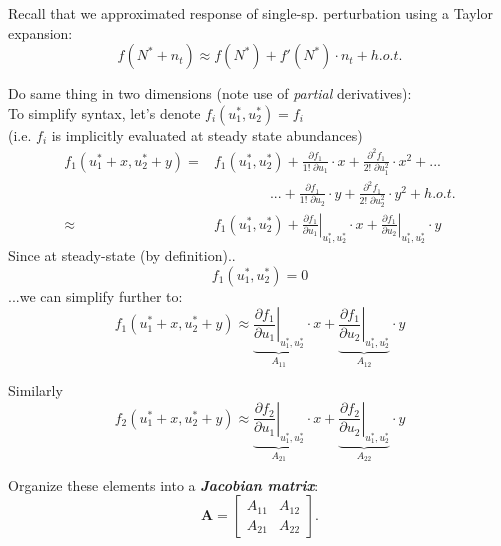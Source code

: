 \documentclass{article}
\newcommand{\ind}{\-\hspace{1cm}}
\begin{document}
Recall that we approximated response of single-sp. perturbation using a Taylor expansion:\\
\begin{equation*}
	f(N^*+n_t)\approx f(N^*)+f'(N^*) \cdot n_t + h.o.t.
\end{equation*}

Do same thing in two dimensions (note use of \emph{partial} derivatives):\\

To simplify syntax, let's denote $f_i(u_1^*,u_2^*) = f_i$\\
\ind (i.e. $f_i$ is implicitly evaluated at steady state abundances)
\begin{align*}
	f_1(u_1^* + x, u_2^* + y) = & f_1(u_1^*,u_2^*) + \frac{\partial f_1}{1! \phantom{.}\partial u_1} \cdot x + \frac{\partial^2 f_1}{2! \phantom{.} \partial u_1^2} \cdot x^2 + ...\\
	&\quad \quad \quad \quad ...  + \frac{\partial f_1}{1!\phantom{.} \partial u_2} \cdot y + \frac{\partial^2 f_1}{2!\phantom{.} \partial u_2^2} \cdot y^2 + h.o.t.\\
	 \approx & f_1(u_1^*, u_2^*) + \left. \frac{\partial f_1}{\partial u_1}\right|_{u_1^*, u_2^*} \cdot x + \left. \frac{\partial f_1}{\partial u_2}\right|_{u_1^*, u_2^*} \cdot y
\end{align*}
Since at steady-state (by definition)..
\begin{equation*}
	f_1(u_1^*,u_2^*)=0
\end{equation*}
...we can simplify further to:
\begin{equation*}
	f_1(u_1^* + x, u_2^* + y)\approx \underbrace{\left. \frac{\partial f_1}{\partial u_1}\right|_{u_1^*, u_2^*}}_{A_{11}} \cdot x + \underbrace{\left. \frac{\partial f_1}{\partial u_2}\right|_{u_1^*, u_2^*}}_{A_{12}} \cdot y
\end{equation*}

Similarly
\begin{equation*}
	f_2(u_1^* + x, u_2^* + y)\approx \underbrace{\left. \frac{\partial f_2}{\partial u_1}\right|_{u_1^*, u_2^*}}_{A_{21}} \cdot x + \underbrace{\left. \frac{\partial f_2}{\partial u_2}\right|_{u_1^*, u_2^*}}_{A_{22}} \cdot y
\end{equation*}

Organize these elements into a \emph{\textbf{Jacobian matrix}}:
\begin{equation*}
\mathbf{A}=
	\begin{bmatrix}
	A_{11} & A_{12}\\
	A_{21} & A_{22}
	\end{bmatrix}.
\end{equation*}
\end{document}
